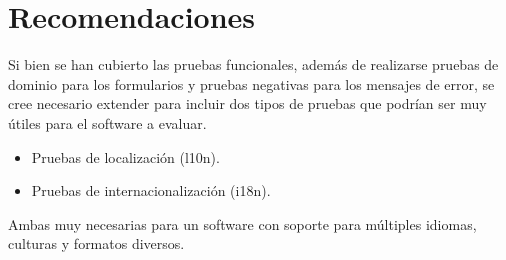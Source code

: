 \section{Recomendaciones}
Si bien se han cubierto las pruebas funcionales, además de realizarse pruebas
de dominio para los formularios y pruebas negativas para los mensajes de error,
se cree necesario extender para incluir dos tipos de pruebas que podrían ser
muy útiles para el software a evaluar.

\begin{itemize}
\item Pruebas de localización (l10n).
\item Pruebas de internacionalización (i18n).
\end{itemize}

Ambas muy necesarias para un software con soporte para múltiples idiomas,
culturas y formatos diversos.

